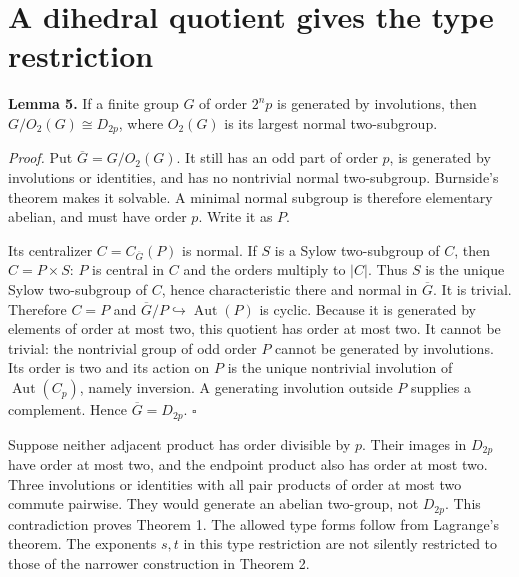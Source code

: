 \section{A dihedral quotient gives the type restriction}\label{a-dihedral-quotient-gives-the-type-restriction}

\textbf{Lemma 5.} If a finite group \(G\) of order \(2^n p\) is generated by
involutions, then \(G/O_2(G)\cong D_{2p}\), where \(O_2(G)\) is its largest
normal two-subgroup.

\emph{Proof.} Put \(\overline G=G/O_2(G)\). It still has an odd part of order
\(p\), is generated by involutions or identities, and has no nontrivial
normal two-subgroup. Burnside's theorem makes it solvable. A minimal
normal subgroup is therefore elementary abelian, and must have order
\(p\). Write it as \(P\).

Its centralizer \(C=C_{\overline G}(P)\) is normal. If \(S\) is a Sylow
two-subgroup of \(C\), then \(C=P\times S\): \(P\) is central in \(C\) and the
orders multiply to \(|C|\). Thus \(S\) is the unique Sylow two-subgroup of
\(C\), hence characteristic there and normal in \(\overline G\). It is
trivial. Therefore \(C=P\) and
\(\overline G/P\hookrightarrow\operatorname{Aut}(P)\) is cyclic.
Because it is generated by elements of order at most two, this quotient
has order at most two. It cannot be trivial: the nontrivial group of
odd order \(P\) cannot be generated by involutions. Its order is two and
its action on \(P\) is the unique nontrivial involution of
\(\operatorname{Aut}(C_p)\), namely inversion. A generating involution
outside \(P\) supplies a complement. Hence \(\overline G=D_{2p}\).
\(\square\)

Suppose neither adjacent product has order divisible by \(p\). Their
images in \(D_{2p}\) have order at most two, and the endpoint product also
has order at most two. Three involutions or identities with all pair
products of order at most two commute pairwise. They would generate an
abelian two-group, not \(D_{2p}\). This contradiction proves Theorem 1.
The allowed type forms follow from Lagrange's theorem. The exponents
\(s,t\) in this type restriction are not silently restricted to those of
the narrower construction in Theorem 2.
